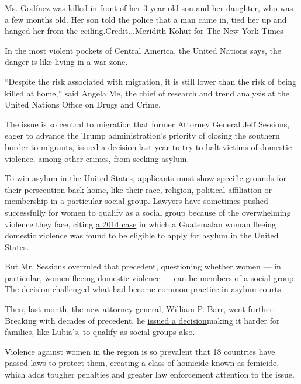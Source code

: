 Ms. Godínez was killed in front of her 3-year-old son and her daughter,
who was a few months old. Her son told the police that a man came in,
tied her up and hanged her from the ceiling.Credit...Meridith Kohut for
The New York Times

In the most violent pockets of Central America, the United Nations says,
the danger is like living in a war zone.

``Despite the risk associated with migration, it is still lower than the
risk of being killed at home,'' said Angela Me, the chief of research
and trend analysis at the United Nations Office on Drugs and Crime.

The issue is so central to migration that former Attorney General Jeff
Sessions, eager to advance the Trump administration's priority of
closing the southern border to migrants,
\href{https://www.nytimes.com/2018/06/11/us/politics/sessions-domestic-violence-asylum.html}{issued
a decision last year} to try to halt victims of domestic violence, among
other crimes, from seeking asylum.

To win asylum in the United States, applicants must show specific
grounds for their persecution back home, like their race, religion,
political affiliation or membership in a particular social group.
Lawyers have sometimes pushed successfully for women to qualify as a
social group because of the overwhelming violence they face, citing
\href{https://www.nytimes.com/2014/08/30/us/victim-of-domestic-violence-in-guatemala-is-ruled-eligible-for-asylum-in-us.html}{a
2014 case} in which a Guatemalan woman fleeing domestic violence was
found to be eligible to apply for asylum in the United States.

But Mr. Sessions overruled that precedent, questioning whether women ---
in particular, women fleeing domestic violence --- can be members of a
social group. The decision challenged what had become common practice in
asylum courts.

Then, last month, the new attorney general, William P. Barr, went
further. Breaking with decades of precedent, he
\href{https://www.nytimes.com/2019/07/29/world/americas/justice-department-asylum-families.html}{issued
a decision}making it harder for families, like Lubia's, to qualify as
social groups also.

Violence against women in the region is so prevalent that 18 countries
have passed laws to protect them, creating a class of homicide known as
femicide, which adds tougher penalties and greater law enforcement
attention to the issue.

